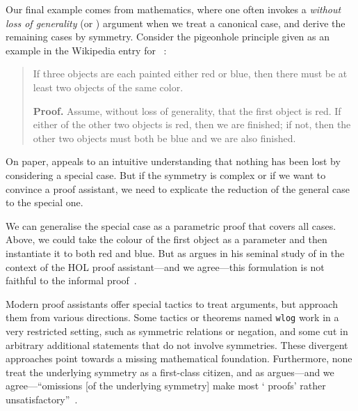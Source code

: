 Our final example comes from mathematics,
where one often invokes a \emph{without loss of generality} (or \WLOG)
argument when we treat a canonical case, and derive the remaining
cases by symmetry. Consider the pigeonhole principle given as an
example in the Wikipedia entry for \WLOG{}~\cite{wiki:wlog}:
%
\begin{quote}
If three objects are each painted either red or blue, then there must
be at least two objects of the same color.

\textbf{Proof.} Assume, without loss of generality, that the first
object is red. If either of the other two objects is red, then we are
finished; if not, then the other two objects must both be blue and we
are also finished.
\end{quote}
%
On paper, \WLOG appeals to an intuitive understanding that nothing has
been lost by considering a special case. But if the symmetry is complex
or if we want to convince a proof assistant, we need
to explicate the reduction of the general case
to the special one.

We can generalise the special case as a parametric proof that covers
all cases. Above, we could take the colour of the first object as a
parameter and then instantiate it to both red and blue. But as
\citeauthor{DBLP:conf/tphol/Harrison09} argues in his seminal study of
\WLOG in the context of the HOL proof assistant---and we agree---this
formulation is not faithful to the informal
proof~\cite{DBLP:conf/tphol/Harrison09}.

Modern proof assistants offer special tactics to treat \WLOG
arguments, but approach them from various directions. Some tactics or
theorems named \texttt{wlog} work in a very restricted setting, such
as symmetric relations or negation, and some cut in arbitrary
additional statements that do not involve symmetries.
These divergent approaches point towards a missing
mathematical foundation. Furthermore, none treat the
underlying symmetry as a first-class citizen, and as
\citeauthor{dijkstra:wlog} argues---and we agree---``omissions [of the
underlying symmetry] make most `\WLOG{} proofs' rather
unsatisfactory''~\cite{dijkstra:wlog}.

